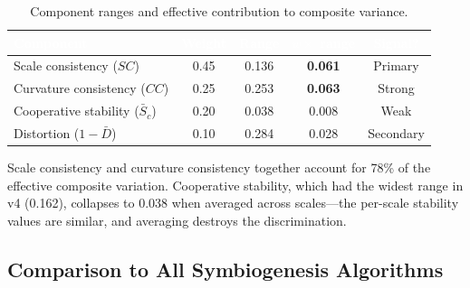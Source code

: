 \documentclass{../yalumba}
\begin{document}
\begin{table}[H]
  \centering
  \tablestyle
  \caption{Component ranges and effective contribution to composite variance.}
  \label{tab:component-analysis}
  \begin{tabular}{lcccc}
    \toprule
    \rowcolor{table-header}
    \textcolor{white}{\textbf{Component}} &
    \textcolor{white}{\textbf{Weight}} &
    \textcolor{white}{\textbf{Range}} &
    \textcolor{white}{\textbf{$w \times$ range}} &
    \textcolor{white}{\textbf{Signal?}} \\
    \midrule
    Scale consistency ($SC$) & 0.45 & 0.136 & \textbf{0.061} & Primary \\
    Curvature consistency ($CC$) & 0.25 & 0.253 & \textbf{0.063} & Strong \\
    Cooperative stability ($\bar{S}_c$) & 0.20 & 0.038 & 0.008 & Weak \\
    Distortion ($1 - \bar{D}$) & 0.10 & 0.284 & 0.028 & Secondary \\
    \bottomrule
  \end{tabular}
\end{table}

Scale consistency and curvature consistency together account for 78\% of the
effective composite variation.  Cooperative stability, which had the widest
range in v4 (0.162), collapses to 0.038 when averaged across scales---the
per-scale stability values are similar, and averaging destroys the
discrimination.

\subsection{Comparison to All Symbiogenesis Algorithms}
\end{document}

